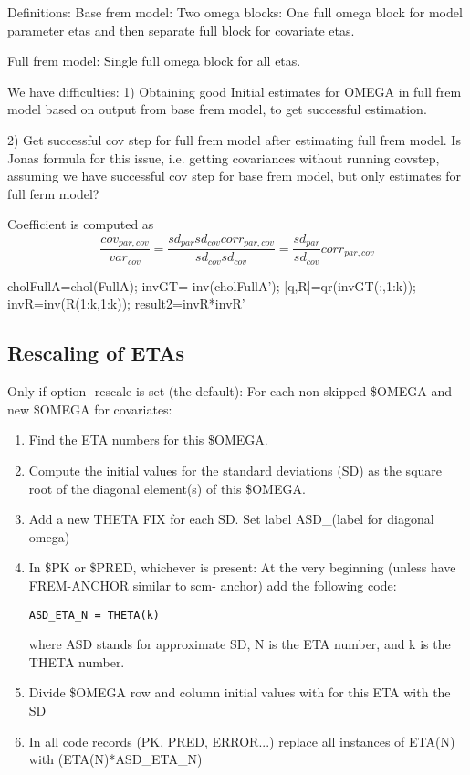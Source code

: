 Definitions:
Base frem model: Two omega blocks: One full omega block for model parameter etas and then separate full block for
covariate etas.

Full frem model: Single full omega block for all etas.

We have difficulties:
1) Obtaining good Initial estimates for OMEGA in full frem model based on output from base frem model,
to get successful estimation.

2) Get successful cov step for full frem model after estimating full frem model.
Is Jonas formula for this issue, i.e. getting covariances without running covstep, assuming we have
successful cov step for base frem model, but only estimates for full ferm model?

Coefficient is computed as
\[
\frac{cov_{par,cov}}{var_{cov}}=\frac{sd_{par}sd_{cov}corr_{par,cov}}{sd_{cov}sd_{cov}}=\frac{sd_{par}}{sd_{cov}}corr_{par,cov}
\]



  cholFullA=chol(FullA);
invGT=  inv(cholFullA'); %
[q,R]=qr(invGT(:,1:k));
invR=inv(R(1:k,1:k));
result2=invR*invR'

\subsection{Rescaling of ETAs}
Only if option -rescale is set (the default):
For each non-skipped \$OMEGA and new \$OMEGA for covariates:
\begin{enumerate}
\item Find the ETA numbers for this \$OMEGA.
\item Compute the initial values for the standard deviations (SD) as the square root of the diagonal
element(s) of this \$OMEGA.
\item Add a new THETA FIX for each SD. Set label ASD\_(label for diagonal omega)
\item In \$PK or \$PRED, whichever is present:
At the very beginning (unless have FREM-ANCHOR similar to scm- anchor) add the following code: \\
\begin{verbatim}
ASD_ETA_N = THETA(k)
\end{verbatim}
where ASD stands for approximate SD, N is the ETA number, and k is the THETA number.
\item Divide \$OMEGA row and column initial values with for this ETA with the SD
\item In all code records (PK, PRED, ERROR...) replace all instances of ETA(N) with (ETA(N)*ASD\_ETA\_N)
\end{enumerate}
